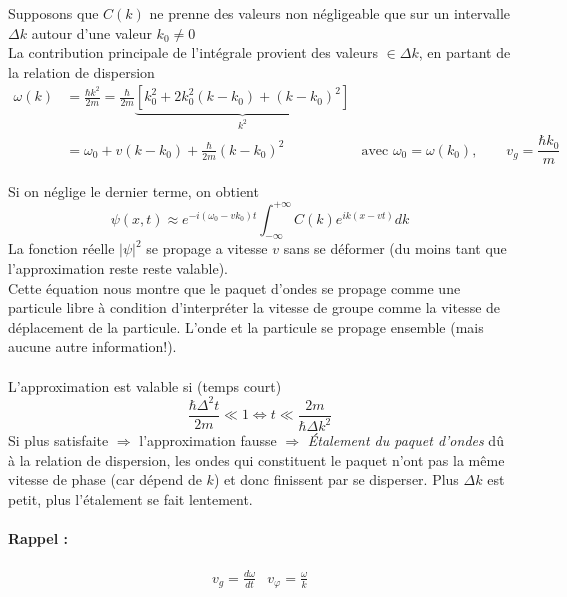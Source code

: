 \documentclass	[11pt, a4paper, openany]{book}
\begin{document}
Supposons que $C(k)$ ne prenne des valeurs non négligeable que sur un intervalle $\Delta k$ autour d'une valeur $k_0\neq0$\\
La contribution principale de l'intégrale provient des valeurs $\in\Delta k$, en partant de la relation de dispersion \begin{align}
\omega(k) & =\frac{\hbar k^2}{2m}=\frac{\hbar}{2m}\underbrace{[k_0^2+2k_0^2(k-k_0)+(k-k_0)^2]}_{k^2}\\
 & =\omega_0+v(k-k_0)+\frac{\hbar}{2m}(k-k_0)^2 &\text{avec } \omega_0=\omega(k_0),\qquad v_g=\dfrac{\hbar k_0}{m}
\end{align}

Si on néglige le dernier terme, on obtient \begin{equation}\psi(x,t) \approx e^{-i(\omega_0-vk_0)t}\int^{+\infty}_{-\infty}C(k)e^{ik(x-vt)}dk
\end{equation}
La fonction réelle $|\psi|^2$ se propage a vitesse $v$ sans se déformer (du moins tant que l'approximation reste reste valable). \\
Cette équation nous montre que le paquet d'ondes se propage comme une particule libre à condition d'interpréter la vitesse de groupe comme la vitesse de déplacement de la particule. L'onde et la particule se propage ensemble (mais aucune autre information!).\\\\
L'approximation est valable si (temps court)
\begin{equation}\frac{\hbar\Delta ^2t}{2m}\ll1\Leftrightarrow t\ll\frac{2m}{\hbar\Delta k^2}\end{equation}
Si plus satisfaite $\Rightarrow$ l'approximation fausse $\Rightarrow$ \textit{Étalement du paquet d'ondes} dû à la relation de dispersion, les ondes qui constituent le paquet n'ont pas la même vitesse de phase (car dépend de $k$) et donc finissent par se disperser. Plus $\Delta k$ est petit, plus l'étalement se fait lentement.
\paragraph{Rappel :}
\begin{equation}
\begin{array}{cc}
v_g=\frac{d\omega}{dt} &  v_{\varphi}=\frac{\omega}{k}
\end{array}{}
\end{equation}
\end{document}

